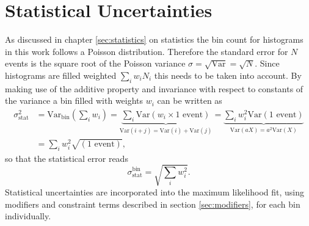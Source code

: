 \section{Statistical Uncertainties}
As discussed in chapter \ref{sec:statistics} on statistics the bin count for histograms in this work follows a Poisson distribution. Therefore the standard error for $N$ events is the square root of the Poisson variance $\sigma=\sqrt{\text{Var}}=\sqrt{N}$. Since histograms are filled weighted $\sum_i w_i N_i$ this needs to be taken into account. By making use of the additive property and invariance with respect to constants of the variance a bin filled with weights $w_i$ can be written as
\begin{align}
    \sigma_\text{stat}^2 & = \text{Var}_\text{bin}\left(\sum_i w_i\right)
    =
    \underbrace{\sum_i \text{Var}(w_i \times 1\text{ event})}_{\text{Var}(i+j)=\text{Var}(i)+\text{Var}(j)}
    =
    \underbrace{\sum_i w_i^2\text{Var}(1\text{ event})}_{\text{Var}(aX)=a^2\text{Var}(X)} \\ \nonumber
                         & =\sum_i w_i^2\sqrt{(1\text{ event})},
\end{align}
so that the statistical error reads
\begin{equation}
    \sigma_\text{stat}^\text{bin}=\sqrt{\sum_i w_i^2}.
\end{equation}
Statistical uncertainties are incorporated into the maximum likelihood fit, using modifiers and constraint terms described in section \ref{sec:modifiers}, for each bin individually.

